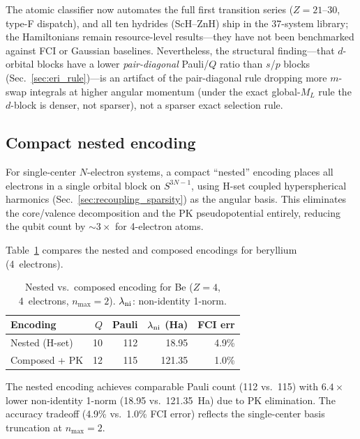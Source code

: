 \documentclass[aps,pra,twocolumn,superscriptaddress,longbibliography]{revtex4-2}
\begin{document}
The atomic classifier now automates the full first transition series
($Z = 21$--30, type-F dispatch), and all ten hydrides (ScH--ZnH) ship
in the 37-system library; the Hamiltonians remain resource-level
results---they have not been benchmarked against FCI or Gaussian
baselines.
Nevertheless, the structural finding---that $d$-orbital blocks have a
lower \emph{pair-diagonal} Pauli/$Q$ ratio than $s$/$p$ blocks
(Sec.~\ref{sec:eri_rule})---is an artifact of the pair-diagonal rule
dropping more $m$-swap integrals at higher angular momentum (under the
exact global-$M_L$ rule the $d$-block is denser, not sparser), not a
sparser exact selection rule.


\subsection{Compact nested encoding}
\label{sec:nested_encoding}

For single-center $N$-electron systems, a compact ``nested'' encoding
places all electrons in a single orbital block on $S^{3N-1}$, using
H-set coupled hyperspherical harmonics (Sec.~\ref{sec:recoupling_sparsity})
as the angular basis.  This eliminates the core/valence decomposition and
the PK pseudopotential entirely, reducing the qubit count by
${\sim}3{\times}$ for 4-electron atoms.

Table~\ref{tab:nested_be} compares the nested and composed encodings for
beryllium (4~electrons).

\begin{table}[t]
\caption{Nested vs.\ composed encoding for Be ($Z = 4$, 4~electrons,
  $n_{\max} = 2$).  $\lambda_{\rm ni}$: non-identity 1-norm.}
\label{tab:nested_be}
\begin{ruledtabular}
\begin{tabular}{lrrrr}
Encoding & $Q$ & Pauli & $\lambda_{\rm ni}$ (Ha) & FCI err \\
\hline
Nested (H-set) & 10 & 112 & 18.95 & 4.9\% \\
Composed + PK  & 12 & 115 & 121.35 & 1.0\% \\
\end{tabular}
\end{ruledtabular}
\end{table}

The nested encoding achieves comparable Pauli count (112 vs.~115) with
$6.4{\times}$ lower non-identity 1-norm (18.95 vs.~121.35~Ha) due to PK
elimination.  The accuracy tradeoff (4.9\% vs.~1.0\% FCI error) reflects
the single-center basis truncation at $n_{\max} = 2$.
\end{document}
